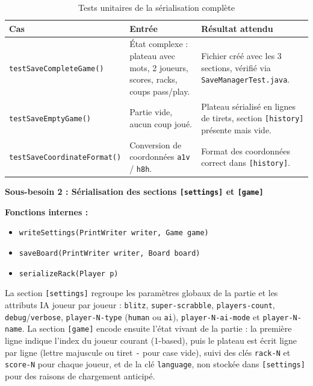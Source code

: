 \documentclass[a4paper]{article}
\begin{document}
\begin{samepage}
\begin{table}[H]
    \centering
    \footnotesize
    \setlength{\tabcolsep}{3pt}
    \renewcommand{\arraystretch}{0.88}
    \begin{tabular}{p{4.1cm} p{4.1cm} p{5.0cm}}
        \toprule
        \textbf{Cas} & \textbf{Entrée} & \textbf{Résultat attendu} \\
        \midrule
        \texttt{testSaveCompleteGame()} & État complexe : plateau avec mots, 2 joueurs, scores, racks, coups pass/play. & Fichier créé avec les 3 sections, vérifié via \texttt{SaveManagerTest.java}. \\
        \midrule
        \texttt{testSaveEmptyGame()} & Partie vide, aucun coup joué. & Plateau sérialisé en lignes de tirets, section \texttt{[history]} présente mais vide. \\
        \midrule
        \texttt{testSaveCoordinateFormat()} & Conversion de coordonnées \texttt{a1v} / \texttt{h8h}. & Format des coordonnées correct dans \texttt{[history]}. \\
        \bottomrule
    \end{tabular}
    \caption{Tests unitaires de la sérialisation complète}
\end{table}

\begin{besoinbox}
    \textbf{\large Sous-besoin 2 : Sérialisation des sections \texttt{[settings]} et \texttt{[game]}}

    \vspace{2mm}
    \textbf{Fonctions internes :}
    \begin{itemize}
        \item \texttt{writeSettings(PrintWriter writer, Game game)}
        \item \texttt{saveBoard(PrintWriter writer, Board board)}
        \item \texttt{serializeRack(Player p)}
    \end{itemize}
    \vspace{2mm}

    La section \texttt{[settings]} regroupe les paramètres globaux de la partie et les attributs IA joueur par joueur : \texttt{blitz}, \texttt{super-scrabble}, \texttt{players-count}, \texttt{debug}/\texttt{verbose}, \texttt{player-N-type} (\texttt{human} ou \texttt{ai}), \texttt{player-N-ai-mode} et \texttt{player-N-name}. La section \texttt{[game]} encode ensuite l'état vivant de la partie : la première ligne indique l'index du joueur courant (1-based), puis le plateau est écrit ligne par ligne (lettre majuscule ou tiret \texttt{-} pour case vide), suivi des clés \texttt{rack-N} et \texttt{score-N} pour chaque joueur, et de la clé \texttt{language}, non stockée dans \texttt{[settings]} pour des raisons de chargement anticipé.
\end{besoinbox}


\end{samepage}
\end{document}

